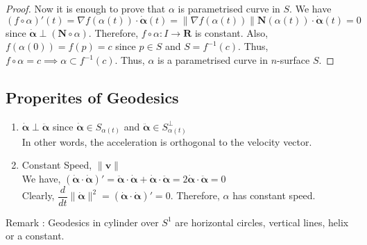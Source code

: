 \begin{proof}
	Now it is enough to prove that $\alpha$ is parametrised curve in $S$. We have $(f \circ \alpha)'(t) = \nabla f(\alpha(t)) \cdot \dot{\boldsymbol{\alpha}}(t) = \| \nabla f(\alpha(t)) \| \mathbf{N}(\alpha(t)) \cdot \dot{\boldsymbol{\alpha}}(t) = 0$ since $\dot{\boldsymbol{\alpha}} \perp (\mathbf{N} \circ \alpha)$. Therefore, $f \circ \alpha : I \to \mathbf{R}$ is constant. Also, $f(\alpha(0)) = f(p) = c$ since $p \in S$ and $S = f^{-1}(c)$. Thus, $f \circ \alpha = c \implies \alpha \subset f^{-1}(c)$. Thus, $\alpha$ is a parametrised curve in $n$-surface $S$.
\end{proof}

\subsection{Properites of Geodesics}
\begin{enumerate}
	\item $\dot{\boldsymbol{\alpha}} \perp \ddot{\boldsymbol{\alpha}}$ since $\dot{\boldsymbol{\alpha}} \in S_{\alpha(t)}$ and $\ddot{\boldsymbol{\alpha}} \in S_{\alpha(t)}^\perp$\\
		In other words, the acceleration is orthogonal to the velocity vector.
	\item Constant Speed, $\| \mathbf{v} \|$\\
		We have, $(\dot{\boldsymbol{\alpha}} \cdot \dot{\boldsymbol{\alpha}})' =  \ddot{\boldsymbol{\alpha}} \cdot \dot{\boldsymbol{\alpha}} + \dot{\boldsymbol{\alpha}} \cdot \ddot{\boldsymbol{\alpha}} = 2\dot{\boldsymbol{\alpha}} \cdot \ddot{\boldsymbol{\alpha}} = 0$\\
		Clearly, $\dfrac{d}{dt} \|\dot{\boldsymbol{\alpha}} \|^2 =  \left( \dot{\boldsymbol{\alpha}} \cdot \dot{\boldsymbol{\alpha}} \right)' = 0$. Therefore, $\alpha$ has constant speed. \\

\end{enumerate} 

Remark :  Geodesics in cylinder over $S^1$ are horizontal circles, vertical lines, helix or a constant. 


